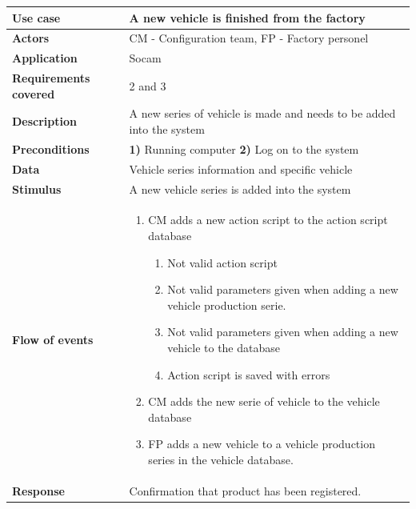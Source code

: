 	\begin{table}[H]
		\centering
		\begin{tabular}{  p{4cm} | p{10cm} }
			\hline
			\rowcolor{gray}
			{\bf Use case} & {\bf A new vehicle is finished from the factory} \\ \hline
			{\bf Actors} & CM - Configuration team, FP - Factory personel \\ \hline
			{\bf Application} & Socam \\ \hline
			{\bf Requirements covered} & 2 and 3 \\ \hline
			{\bf Description} & A new series of vehicle is made and needs to be 
			added into the system \\ \hline
			{\bf Preconditions} & {\bf 1)} Running computer {\bf 2)} Log on to the system \\ \hline
			{\bf Data} & Vehicle series information and specific vehicle \\ \hline
			{\bf Stimulus} & A new vehicle series is added into the system \\ \hline
			{\bf Flow of events} & 
				\begin{enumerate}[font=\bfseries]
					\item CM adds a new action script to the action script database
						\begin{enumerate}[label*=\arabic*., font=\bfseries]
							\item Not valid action script
							\item Not valid parameters given when adding a new vehicle 
							production serie.
							\item Not valid parameters given when adding a new vehicle 
							to the database
							\item Action script is saved with errors
						\end{enumerate}
					\item CM adds the new serie of vehicle to the vehicle database
					\item FP adds a new vehicle to a vehicle production series in the vehicle database. 
				\end{enumerate}
			
			\\ \hline
			{\bf Response} & Confirmation that product has been registered. \\ \hline
		\end{tabular}
	\end{table}